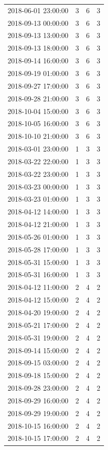 \begin{tabular}{lrrr}
2018-06-01 23:00:00 & 3 & 6 & 3 \\
2018-09-13 00:00:00 & 3 & 6 & 3 \\
2018-09-13 13:00:00 & 3 & 6 & 3 \\
2018-09-13 18:00:00 & 3 & 6 & 3 \\
2018-09-14 16:00:00 & 3 & 6 & 3 \\
2018-09-19 01:00:00 & 3 & 6 & 3 \\
2018-09-27 17:00:00 & 3 & 6 & 3 \\
2018-09-28 21:00:00 & 3 & 6 & 3 \\
2018-10-04 15:00:00 & 3 & 6 & 3 \\
2018-10-05 16:00:00 & 3 & 6 & 3 \\
2018-10-10 21:00:00 & 3 & 6 & 3 \\
2018-03-01 23:00:00 & 1 & 3 & 3 \\
2018-03-22 22:00:00 & 1 & 3 & 3 \\
2018-03-22 23:00:00 & 1 & 3 & 3 \\
2018-03-23 00:00:00 & 1 & 3 & 3 \\
2018-03-23 01:00:00 & 1 & 3 & 3 \\
2018-04-12 14:00:00 & 1 & 3 & 3 \\
2018-04-12 21:00:00 & 1 & 3 & 3 \\
2018-05-26 01:00:00 & 1 & 3 & 3 \\
2018-05-28 17:00:00 & 1 & 3 & 3 \\
2018-05-31 15:00:00 & 1 & 3 & 3 \\
2018-05-31 16:00:00 & 1 & 3 & 3 \\
2018-04-12 11:00:00 & 2 & 4 & 2 \\
2018-04-12 15:00:00 & 2 & 4 & 2 \\
2018-04-20 19:00:00 & 2 & 4 & 2 \\
2018-05-21 17:00:00 & 2 & 4 & 2 \\
2018-05-31 19:00:00 & 2 & 4 & 2 \\
2018-09-14 15:00:00 & 2 & 4 & 2 \\
2018-09-15 03:00:00 & 2 & 4 & 2 \\
2018-09-18 15:00:00 & 2 & 4 & 2 \\
2018-09-28 23:00:00 & 2 & 4 & 2 \\
2018-09-29 16:00:00 & 2 & 4 & 2 \\
2018-09-29 19:00:00 & 2 & 4 & 2 \\
2018-10-15 16:00:00 & 2 & 4 & 2 \\
2018-10-15 17:00:00 & 2 & 4 & 2 \\

\end{tabular}
